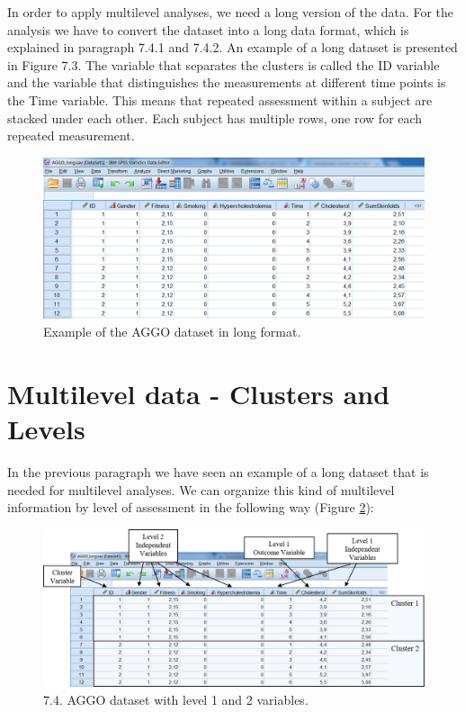 \documentclass[]{book}
\theoremstyle{definition}
\theoremstyle{definition}
\theoremstyle{definition}
\theoremstyle{remark}
\begin{document}
In order to apply multilevel analyses, we need a long version of the
data. For the analysis we have to convert the dataset into a long data
format, which is explained in paragraph 7.4.1 and 7.4.2. An example of a
long dataset is presented in Figure 7.3. The variable that separates the
clusters is called the ID variable and the variable that distinguishes
the measurements at different time points is the Time variable. This
means that repeated assessment within a subject are stacked under each
other. Each subject has multiple rows, one row for each repeated
measurement.

\begin{figure}

{\centering \includegraphics[width=0.9\linewidth]{images/fig7.3} 

}

\caption{Example of the AGGO dataset in long format.}\label{fig:fig73}
\end{figure}

\section{Multilevel data - Clusters and
Levels}\label{multilevel-data---clusters-and-levels}

In the previous paragraph we have seen an example of a long dataset that
is needed for multilevel analyses. We can organize this kind of
multilevel information by level of assessment in the following way
(Figure \ref{fig:fig74}):

\begin{figure}

{\centering \includegraphics[width=0.9\linewidth]{images/fig7.4} 

}

\caption{7.4. AGGO dataset with level 1 and 2 variables.}\label{fig:fig74}
\end{figure}
\end{document}
